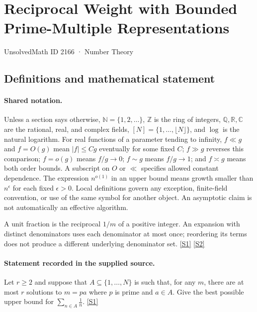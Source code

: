 \documentclass[11pt,a4paper]{article}
\newcommand{\N}{\mathbb{N}}
\newcommand{\Z}{\mathbb{Z}}
\newcommand{\Q}{\mathbb{Q}}
\newcommand{\R}{\mathbb{R}}
\newcommand{\C}{\mathbb{C}}
\newcommand{\sref}[2]{\hyperlink{source:#1:#2}{[S#2]}}
\begin{document}

\setcounter{section}{2165}

\section{Reciprocal Weight with Bounded Prime-Multiple Representations}\label{2166}

{\small\sffamily UnsolvedMath ID 2166 · Number Theory}

\subsection{Definitions and mathematical statement}

\paragraph{Shared notation.}Unless a section says otherwise, $\N=\{1,2,\ldots\}$,
$\Z$ is the ring of integers, $\Q,\R,\C$ are the rational, real, and complex
fields, $[N]=\{1,\ldots,\lfloor N\rfloor\}$, and $\log$ is the natural
logarithm. For real functions of a parameter tending to infinity,
$f\ll g$ and $f=O(g)$ mean $|f|\leq Cg$ eventually for some fixed $C$;
$f\gg g$ reverses this comparison; $f=o(g)$ means $f/g\to0$;
$f\sim g$ means $f/g\to1$; and $f\asymp g$ means both order bounds.
A subscript on $O$ or $\ll$ specifies allowed constant dependence.
The expression $n^{o(1)}$ in an upper bound means growth smaller than
$n^\epsilon$ for each fixed $\epsilon>0$. Local definitions govern any
exception, finite-field convention, or use of the same symbol for another
object. An asymptotic claim is not automatically an effective algorithm.



A unit fraction is the reciprocal $1/m$ of a positive integer. An expansion with distinct denominators uses each denominator at most once; reordering its terms does not produce a different underlying denominator set. \sref{2166}{1} \sref{2166}{2}

\paragraph{Statement recorded in the supplied source.}
Let $r\geq 2$ and suppose that $A\subseteq\{1,\ldots,N\}$ is such that, for any $m$, there are at most $r$ solutions to $m=pa$ where $p$ is prime and $a\in A$. Give the best possible upper bound for $ \sum_{n\in A}\frac{1}{n}. $ \sref{2166}{1}
\end{document}
